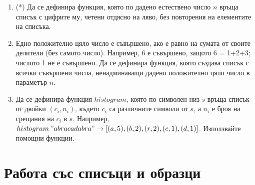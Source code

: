 \begin{enumerate}
  \item(*) Да се дефинира функция, която по дадено естествено число $n$ връща списък с цифрите му, четени отдясно на ляво, без повторения на елементите на списъка.

  \item Едно положително цяло число е съвършено, ако е равно на сумата от своите делители (без самото число). Например, 6 е съвършено, защото 6 = 1+2+3; числото 1 не е съвършено. Да се дефинира функция, която създава списък с  всички съвършени числа, ненадминаващи дадено положително цяло число в параметър $n$.
  
  \item Да се дефинира функция $histogram$, която по символен низ $s$ връща списък от двойки $(c_i,n_i)$, където $c_i$ са различните символи от $s$, а $n_i$ е броя на срещания на $c_i$ в $s$. Например, $histogram \: "abracadabra" \rightarrow [(a,5), (b,2), (r,2), (c,1), (d,1)]$. Използвайте помощни функции.
\end{enumerate}

\section {Работа със списъци и образци}

